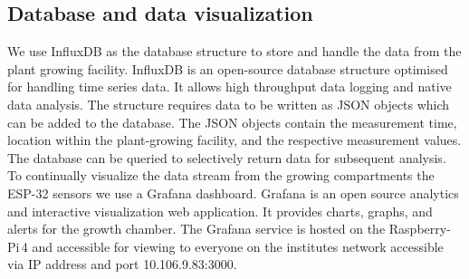 \documentclass[reprint,superscriptaddress,aps,amsmath,amssymb]{revtex4-1}
\begin{document}
\subsection{Database and data visualization}
We use InfluxDB as the database structure to store and handle the data from the plant growing facility. InfluxDB is an open-source database structure optimised for handling time series data. It allows high throughput data logging and native data analysis. The structure requires data to be written as JSON objects which can be added to the database. The JSON objects contain the measurement time, location within the plant-growing facility, and the respective measurement values. The database can be queried to selectively return data for subsequent analysis. To continually visualize the data stream from the growing compartments  the ESP-32 sensors we use a Grafana dashboard. Grafana is an open source analytics and interactive visualization web application. It provides charts, graphs, and alerts for the growth chamber. The Grafana service is hosted on the Raspberry-Pi\,4 and accessible for viewing to everyone on the institutes network accessible via IP address and port 10.106.9.83:3000.
\end{document}

